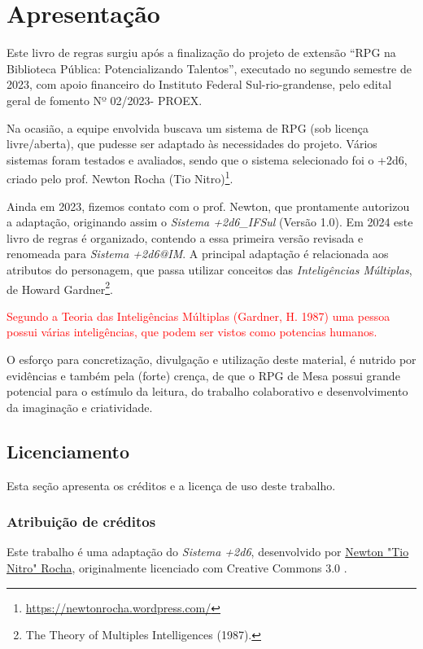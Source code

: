 \chapter[Apresentação]{\label{ch:apres}Apresentação}

Este livro de regras surgiu após a finalização do projeto de extensão “RPG na Biblioteca Pública: Potencializando Talentos”, executado no segundo semestre de 2023, com apoio financeiro do Instituto Federal Sul-rio-grandense, pelo edital geral de fomento Nº 02/2023- PROEX. 

Na ocasião, a equipe envolvida buscava um sistema de RPG (sob licença livre/aberta), que pudesse ser adaptado às necessidades do projeto. Vários sistemas foram testados e avaliados, sendo que o sistema selecionado foi o +2d6, criado pelo prof. Newton Rocha (Tio Nitro)\footnote{\url{https://newtonrocha.wordpress.com/}}. 

Ainda em 2023, fizemos contato com o prof. Newton, que prontamente autorizou a adaptação, originando assim o \emph{Sistema +2d6\_IFSul} (Versão 1.0). Em 2024 este livro de regras é organizado, contendo a essa primeira versão revisada e renomeada para \emph{Sistema +2d6@IM}. A principal adaptação é relacionada aos atributos do personagem, que passa utilizar conceitos das \emph{Inteligências Múltiplas}, de Howard Gardner\footnote{The Theory of Multiples Intelligences (1987).}.

\textcolor{red}{Segundo a Teoria das Inteligências Múltiplas (Gardner, H. 1987) uma pessoa possui várias inteligências, que podem ser vistos como potencias humanos. }

O esforço para concretização, divulgação e utilização deste material, é nutrido por evidências e também pela (forte) crença, de que o RPG de Mesa possui grande potencial para o estímulo da leitura, do trabalho colaborativo e desenvolvimento da imaginação e criatividade.

\section{\label{sec:cred}Licenciamento} 
Esta seção apresenta os créditos e a licença de uso deste trabalho.

\subsection*{Atribuição de créditos}
Este trabalho é uma adaptação do \emph{Sistema +2d6}, desenvolvido por \href{http://newtonrocha.wordpress.com/}{Newton "Tio Nitro" Rocha}, originalmente licenciado com Creative Commons 3.0 \ccby.

